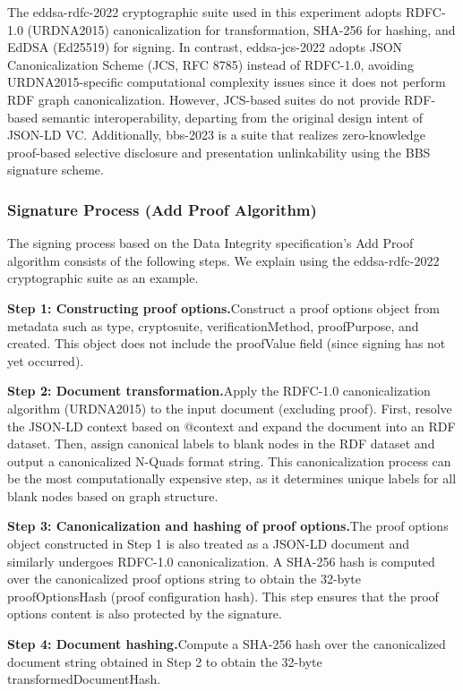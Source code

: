 \documentclass[conference]{IEEEtran}
\begin{document}
The eddsa-rdfc-2022 cryptographic suite used in this experiment adopts RDFC-1.0 (URDNA2015) canonicalization for transformation, SHA-256 for hashing, and EdDSA (Ed25519) for signing. In contrast, eddsa-jcs-2022 adopts JSON Canonicalization Scheme (JCS, RFC 8785) instead of RDFC-1.0, avoiding URDNA2015-specific computational complexity issues since it does not perform RDF graph canonicalization. However, JCS-based suites do not provide RDF-based semantic interoperability, departing from the original design intent of JSON-LD VC. Additionally, bbs-2023 is a suite that realizes zero-knowledge proof-based selective disclosure and presentation unlinkability using the BBS signature scheme.

\subsubsection{Signature Process (Add Proof Algorithm)}

The signing process based on the Data Integrity specification's Add Proof algorithm consists of the following steps. We explain using the eddsa-rdfc-2022 cryptographic suite as an example.

\textbf{Step 1: Constructing proof options.}Construct a proof options object from metadata such as type, cryptosuite, verificationMethod, proofPurpose, and created. This object does not include the proofValue field (since signing has not yet occurred).

\textbf{Step 2: Document transformation.}Apply the RDFC-1.0 canonicalization algorithm (URDNA2015) to the input document (excluding proof). First, resolve the JSON-LD context based on @context and expand the document into an RDF dataset. Then, assign canonical labels to blank nodes in the RDF dataset and output a canonicalized N-Quads format string. This canonicalization process can be the most computationally expensive step, as it determines unique labels for all blank nodes based on graph structure.

\textbf{Step 3: Canonicalization and hashing of proof options.}The proof options object constructed in Step 1 is also treated as a JSON-LD document and similarly undergoes RDFC-1.0 canonicalization. A SHA-256 hash is computed over the canonicalized proof options string to obtain the 32-byte proofOptionsHash (proof configuration hash). This step ensures that the proof options content is also protected by the signature.

\textbf{Step 4: Document hashing.}Compute a SHA-256 hash over the canonicalized document string obtained in Step 2 to obtain the 32-byte transformedDocumentHash.
\end{document}

